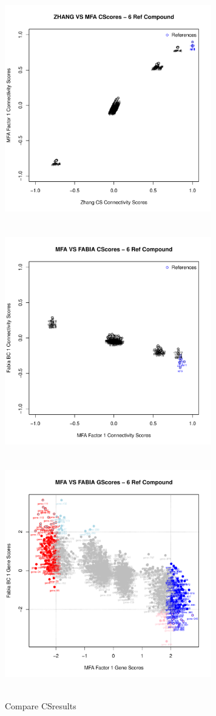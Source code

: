 \documentclass[a4paper]{article}\usepackage[]{graphicx}\usepackage[]{color}
\newenvironment{knitrout}{}{} %
\begin{document}
\begin{knitrout}
\begin{figure}[H]
\includegraphics[width=9cm,height=10cm]{figure/CScompare-1} 
\includegraphics[width=9cm,height=10cm]{figure/CScompare-2} 
\includegraphics[width=9cm,height=10cm]{figure/CScompare-3} \hfill{}

\caption[Compare CSresults]{Compare CSresults\label{fig:CScompare}}
\end{figure}


\end{knitrout}
\end{document}
